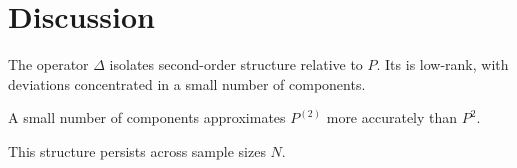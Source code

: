 \section{Discussion}

The operator $\Delta$ isolates second-order structure relative to $P$. Its is low-rank, with deviations concentrated in a small number of components.

A small number of components approximates $P^{(2)}$ more accurately than $P^2$.

This structure persists across sample sizes $N$.

